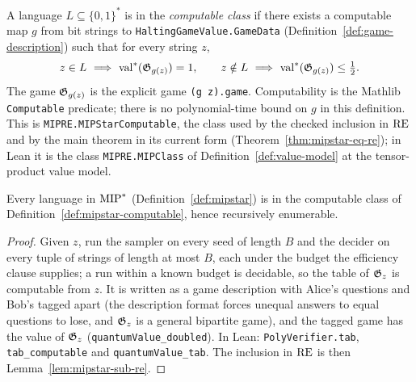 \begin{definition}
\label{def:mipstar-computable}
\leanok
A language $L\subseteq\{0,1\}^*$ is in the \emph{computable class} if there exists
a computable map $g$ from bit strings to \texttt{HaltingGameValue.GameData}
(Definition~\ref{def:game-description}) such that for every string $z$,
\begin{equation*}
  z\in L\ \Longrightarrow\ \valstar(\game_{g(z)})=1,
  \qquad
  z\notin L\ \Longrightarrow\ \valstar(\game_{g(z)})\leq\tfrac12.
\end{equation*}
The game $\mathfrak{G}_{g(z)}$ is the explicit game \texttt{(g z).game}. Computability is the
Mathlib \texttt{Computable} predicate; there is no polynomial-time bound on $g$ in this
definition. This is \texttt{MIPRE.MIPStarComputable}, the class used by the checked inclusion
in $\mathrm{RE}$ and by the main theorem in its current form (Theorem~\ref{thm:mipstar-eq-re}); in
Lean it is the class \texttt{MIPRE.MIPClass} of Definition~\ref{def:value-model} at the
tensor-product value model.
\end{definition}

\begin{lemma}
\label{lem:mipstar-poly-sub}
\leanok
Every language in $\mathrm{MIP}^*$ (Definition~\ref{def:mipstar}) is in the computable class of
Definition~\ref{def:mipstar-computable}, hence recursively enumerable.
\end{lemma}

\begin{proof}
\leanok
Given $z$, run the sampler on every seed of length $B$ and the decider on every tuple of
strings of length at most $B$, each under the budget the efficiency clause supplies; a run
within a known budget is decidable, so the table of $\mathfrak{G}_z$ is computable from $z$. It is
written as a game description with Alice's questions and Bob's tagged apart (the description
format forces unequal answers to equal questions to lose, and $\mathfrak{G}_z$ is a general bipartite
game), and the tagged game has the value of $\mathfrak{G}_z$ (\texttt{quantumValue\_doubled}). In Lean:
\texttt{PolyVerifier.tab}, \texttt{tab\_computable} and \texttt{quantumValue\_tab}. The
inclusion in $\mathrm{RE}$ is then Lemma~\ref{lem:mipstar-sub-re}.
\end{proof}


